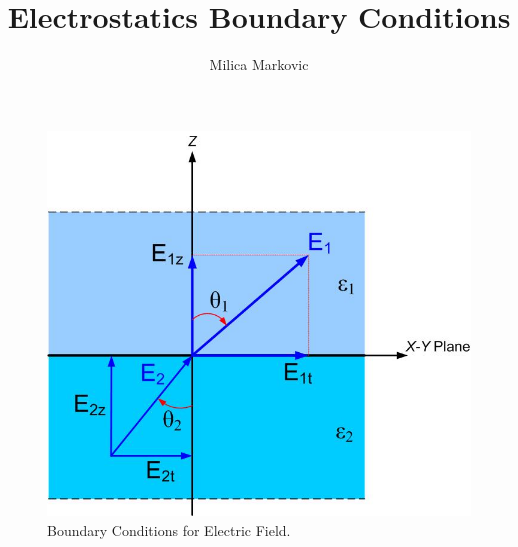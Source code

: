 \documentclass{ximera}
\title{Electrostatics Boundary Conditions}
\author{Milica Markovic}
\begin{document}
  
\begin{abstract}  

\end{abstract}  
\maketitle    






\begin{figure}[htbp]
\begin{center}
\includegraphics[scale=0.5]{../jpg/boundaryconditions.jpg}
\end{center}
\caption{Boundary Conditions for Electric Field.}
\label{BoundaryCondition}
\end{figure}
\end{document}
